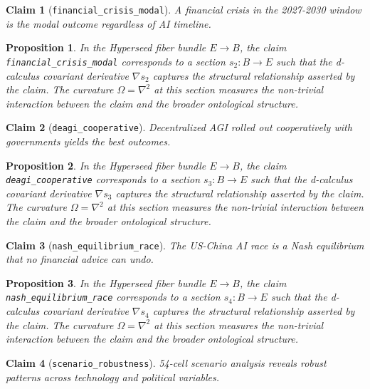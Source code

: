 \documentclass{article}
\newtheorem{claim}{Claim}
\newtheorem{proposition}{Proposition}
\begin{document}
\begin{claim}[\texttt{financial_crisis_modal}]
A financial crisis in the 2027-2030 window is the modal outcome regardless of AI timeline.
\end{claim}

\begin{proposition}
In the Hyperseed fiber bundle $E \to B$, the claim \texttt{financial_crisis_modal} corresponds to a section $s_2: B \to E$ such that the d-calculus covariant derivative $\nabla s_2$ captures the structural relationship asserted by the claim. The curvature $\Omega = \nabla^2$ at this section measures the non-trivial interaction between the claim and the broader ontological structure.
\end{proposition}

\begin{claim}[\texttt{deagi_cooperative}]
Decentralized AGI rolled out cooperatively with governments yields the best outcomes.
\end{claim}

\begin{proposition}
In the Hyperseed fiber bundle $E \to B$, the claim \texttt{deagi_cooperative} corresponds to a section $s_3: B \to E$ such that the d-calculus covariant derivative $\nabla s_3$ captures the structural relationship asserted by the claim. The curvature $\Omega = \nabla^2$ at this section measures the non-trivial interaction between the claim and the broader ontological structure.
\end{proposition}

\begin{claim}[\texttt{nash_equilibrium_race}]
The US-China AI race is a Nash equilibrium that no financial advice can undo.
\end{claim}

\begin{proposition}
In the Hyperseed fiber bundle $E \to B$, the claim \texttt{nash_equilibrium_race} corresponds to a section $s_4: B \to E$ such that the d-calculus covariant derivative $\nabla s_4$ captures the structural relationship asserted by the claim. The curvature $\Omega = \nabla^2$ at this section measures the non-trivial interaction between the claim and the broader ontological structure.
\end{proposition}

\begin{claim}[\texttt{scenario_robustness}]
54-cell scenario analysis reveals robust patterns across technology and political variables.
\end{claim}
\end{document}

